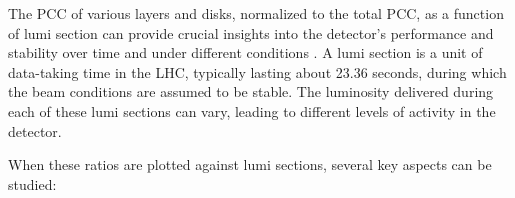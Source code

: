 


The PCC of various layers and disks, normalized to the total PCC, as a function of lumi section can provide crucial insights into the detector's performance and stability over time and under different conditions \cite{CMS-PAS-LUM-15-001}\cite{CMS-PAS-LUM-16-001}. A lumi section is a unit of data-taking time in the LHC, typically lasting about 23.36 seconds, during which the beam conditions are assumed to be stable. The luminosity delivered during each of these lumi sections can vary, leading to different levels of activity in the detector.

When these ratios are plotted against lumi sections, several key aspects can be studied:

